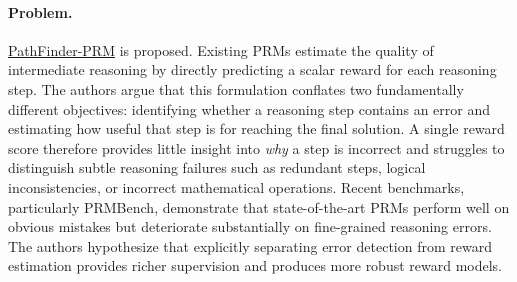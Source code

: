 \documentclass[11pt]{article}
\begin{document}
\paragraph{Problem.}
\href{https://arxiv.org/abs/2505.19706}{PathFinder-PRM} is proposed. Existing PRMs estimate the quality of intermediate reasoning by directly predicting a scalar reward for each reasoning step. The authors argue that this formulation conflates two fundamentally different objectives: identifying whether a reasoning step contains an error and estimating how useful that step is for reaching the final solution. A single reward score therefore provides little insight into \emph{why} a step is incorrect and struggles to distinguish subtle reasoning failures such as redundant steps, logical inconsistencies, or incorrect mathematical operations. Recent benchmarks, particularly PRMBench, demonstrate that state-of-the-art PRMs perform well on obvious mistakes but deteriorate substantially on fine-grained reasoning errors. The authors hypothesize that explicitly separating error detection from reward estimation provides richer supervision and produces more robust reward models. 
\end{document}
